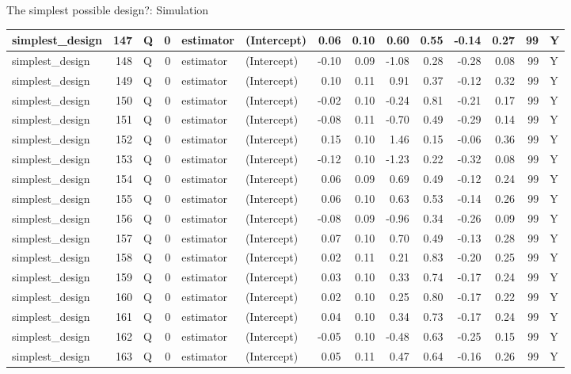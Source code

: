 \documentclass[
  11pt,
  ignorenonframetext,
]{beamer}
\begin{document}
\begin{frame}[fragile]{The simplest possible design?: Simulation}
\begin{tabular}{l|r|l|r|l|l|r|r|r|r|r|r|r|l}
\hline
simplest\_design & 147 & Q & 0 & estimator & (Intercept) & 0.06 & 0.10 & 0.60 & 0.55 & -0.14 & 0.27 & 99 & Y\\
\hline
simplest\_design & 148 & Q & 0 & estimator & (Intercept) & -0.10 & 0.09 & -1.08 & 0.28 & -0.28 & 0.08 & 99 & Y\\
\hline
simplest\_design & 149 & Q & 0 & estimator & (Intercept) & 0.10 & 0.11 & 0.91 & 0.37 & -0.12 & 0.32 & 99 & Y\\
\hline
simplest\_design & 150 & Q & 0 & estimator & (Intercept) & -0.02 & 0.10 & -0.24 & 0.81 & -0.21 & 0.17 & 99 & Y\\
\hline
simplest\_design & 151 & Q & 0 & estimator & (Intercept) & -0.08 & 0.11 & -0.70 & 0.49 & -0.29 & 0.14 & 99 & Y\\
\hline
simplest\_design & 152 & Q & 0 & estimator & (Intercept) & 0.15 & 0.10 & 1.46 & 0.15 & -0.06 & 0.36 & 99 & Y\\
\hline
simplest\_design & 153 & Q & 0 & estimator & (Intercept) & -0.12 & 0.10 & -1.23 & 0.22 & -0.32 & 0.08 & 99 & Y\\
\hline
simplest\_design & 154 & Q & 0 & estimator & (Intercept) & 0.06 & 0.09 & 0.69 & 0.49 & -0.12 & 0.24 & 99 & Y\\
\hline
simplest\_design & 155 & Q & 0 & estimator & (Intercept) & 0.06 & 0.10 & 0.63 & 0.53 & -0.14 & 0.26 & 99 & Y\\
\hline
simplest\_design & 156 & Q & 0 & estimator & (Intercept) & -0.08 & 0.09 & -0.96 & 0.34 & -0.26 & 0.09 & 99 & Y\\
\hline
simplest\_design & 157 & Q & 0 & estimator & (Intercept) & 0.07 & 0.10 & 0.70 & 0.49 & -0.13 & 0.28 & 99 & Y\\
\hline
simplest\_design & 158 & Q & 0 & estimator & (Intercept) & 0.02 & 0.11 & 0.21 & 0.83 & -0.20 & 0.25 & 99 & Y\\
\hline
simplest\_design & 159 & Q & 0 & estimator & (Intercept) & 0.03 & 0.10 & 0.33 & 0.74 & -0.17 & 0.24 & 99 & Y\\
\hline
simplest\_design & 160 & Q & 0 & estimator & (Intercept) & 0.02 & 0.10 & 0.25 & 0.80 & -0.17 & 0.22 & 99 & Y\\
\hline
simplest\_design & 161 & Q & 0 & estimator & (Intercept) & 0.04 & 0.10 & 0.34 & 0.73 & -0.17 & 0.24 & 99 & Y\\
\hline
simplest\_design & 162 & Q & 0 & estimator & (Intercept) & -0.05 & 0.10 & -0.48 & 0.63 & -0.25 & 0.15 & 99 & Y\\
\hline
simplest\_design & 163 & Q & 0 & estimator & (Intercept) & 0.05 & 0.11 & 0.47 & 0.64 & -0.16 & 0.26 & 99 & Y\\

\end{tabular}
\end{frame}
\end{document}
